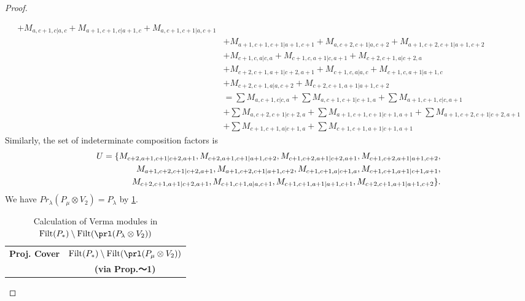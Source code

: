 \begin{proof}
\begin{enumerate}
\begin{enumerate}
\begin{equation}
\begin{aligned}
+ M_{a,c+1,c|a,c}
+ M_{a+1,c+1,c|a+1,c}
+ M_{a,c+1,c+1|a,c+1}\\ 
                                              &
+ M_{a+1,c+1,c+1|a+1,c+1}
+ M_{a,c+2,c+1|a,c+2}
+ M_{a+1,c+2,c+1|a+1,c+2}\\ 
                                              &
+ M_{c+1,c,a|c,a}
+ M_{c+1,c,a+1|c,a+1}
+ M_{c+2,c+1,a|c+2,a}\\ 
                                              &
+ M_{c+2,c+1,a+1|c+2,a+1}
+ M_{c+1,c,a|a,c}
+ M_{c+1,c,a+1|a+1,c}\\ 
                                              &
+ M_{c+2,c+1,a|a,c+2}
+ M_{c+2,c+1,a+1|a+1,c+2} \\
                                               &=
\sum M_{a,c+1,c|c,a}
+ \sum M_{a,c+1,c+1|c+1,a}
+ \sum M_{a+1,c+1,c|c,a+1}\\ 
                                              &
+ \sum M_{a,c+2,c+1|c+2,a}
+ \sum M_{a+1,c+1,c+1|c+1,a+1}
+ \sum M_{a+1,c+2,c+1|c+2,a+1}\\ 
                                              &
+ \sum M_{c+1,c+1,a|c+1,a}
+ \sum M_{c+1,c+1,a+1|c+1,a+1}
          \end{aligned}
        \end{equation}
      Similarly, the set of indeterminate composition factors is 
\begin{equation}\notag
  \begin{aligned}
    U = \{
M_{c+2,a+1,c+1|c+2,a+1},
M_{c+2,a+1,c+1|a+1,c+2},
M_{c+1,c+2,a+1|c+2,a+1},
M_{c+1,c+2,a+1|a+1,c+2},\\
M_{a+1,c+2,c+1|c+2,a+1},
M_{a+1,c+2,c+1|a+1,c+2},
M_{c+1,c+1,a|c+1,a},
M_{c+1,c+1,a+1|c+1,a+1},\\
M_{c+2,c+1,a+1|c+2,a+1},
M_{c+1,c+1,a|a,c+1},
M_{c+1,c+1,a+1|a+1,c+1},
M_{c+2,c+1,a+1|a+1,c+2}
\}.
  \end{aligned}
\end{equation}
      We have $Pr_{\lambda}(P_\mu \otimes V_{2}) = P_\lambda  $ by \cref{tab:verma-analysis_f_0}.
\begin{table}[htbp]
\centering
\caption{Calculation of Verma modules in $\operatorname{Filt}(P_*) \setminus \operatorname{Filt}(\prl(P_\lambda \otimes V_{2})) $ } \label{tab:verma-analysis_f_0}
\begin{tabular}{cc}
\toprule
\textbf{Proj. Cover} & \textbf{$\operatorname{Filt}(P_*) \setminus \operatorname{Filt}(\prl(P_\mu \otimes V_{2})) $}  \\
     & \textbf{(via Prop.～1)}  \\

\end{tabular}
\end{table}
\end{enumerate}
\end{enumerate}
\end{proof}
